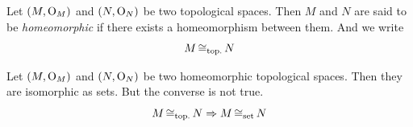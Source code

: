 \begin{definition}[Homeomorphic]
	Let \((M, \mathrm{O}_M)\) and \((N, \mathrm{O}_N)\) be two topological spaces. Then \(M\) and \(N\) are said to be \emph{homeomorphic} if there exists a homeomorphism between them. And we write
	\begin{equation}
		M \operatorname{\mathrel{\cong_{\text{top.}}}} N \label{eq:homeomorphic}
	\end{equation}
\end{definition}

\begin{remark}
	Let \((M, \mathrm{O}_M)\) and \((N, \mathrm{O}_N)\) be two homeomorphic topological spaces. Then they are isomorphic as sets. But the converse is not true.
	\begin{equation}
		M \operatorname{\mathrel{\cong_{\text{top.}}}} N \Rightarrow M \operatorname{\mathrel{\cong_{\text{set}}}} N \label{eq:homeomorphic_isomorphic}
	\end{equation}
\end{remark}
